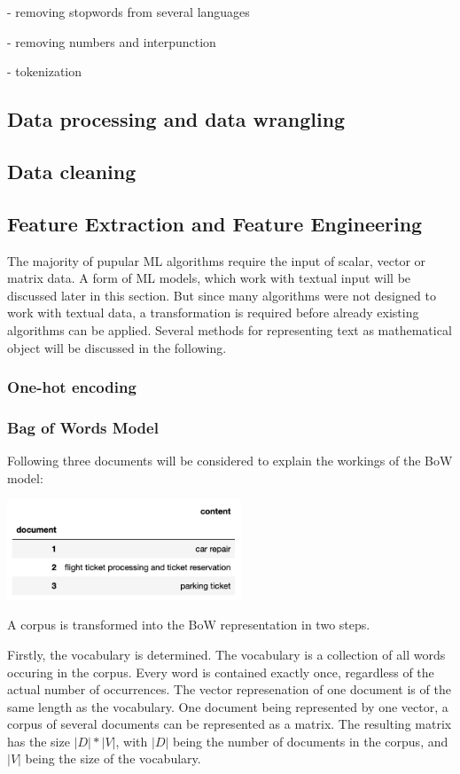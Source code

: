 - removing stopwords from several languages

- removing numbers and interpunction

- tokenization

	\subsection{Data processing and data wrangling}
	
	
	\subsection{Data cleaning}
	
	\subsection{Feature Extraction and Feature Engineering}
	The majority of pupular ML algorithms require the input of scalar, vector or matrix data. A form of ML models, which work with textual input will be discussed later in this section. 
	But since many algorithms were not designed to work with textual data, a transformation is required before already existing algorithms can be applied. Several methods for representing text as mathematical object will be discussed in the following.

		\subsubsection{One-hot encoding}
		

		\subsubsection{Bag of Words Model}
		Following three documents will be considered to explain the workings of the \ac{BoW} model:

		\includegraphics[height=3cm]{Bilder/corpus_bow.png}
		
		A corpus is transformed into the \ac{BoW} representation in two steps. 
		
		Firstly, the vocabulary is determined. 
		The vocabulary is a collection of all words occuring in the corpus. Every word is contained exactly once, regardless of the actual number of occurrences. The vector represenation of one document is of the same length as the vocabulary. One document being represented by one vector, a corpus of several documents can be represented as a matrix. The resulting matrix has the size $ |D|*|V| $, with $|D|$ being the number of documents in the corpus, and $|V|$ being the size of the vocabulary.
		
